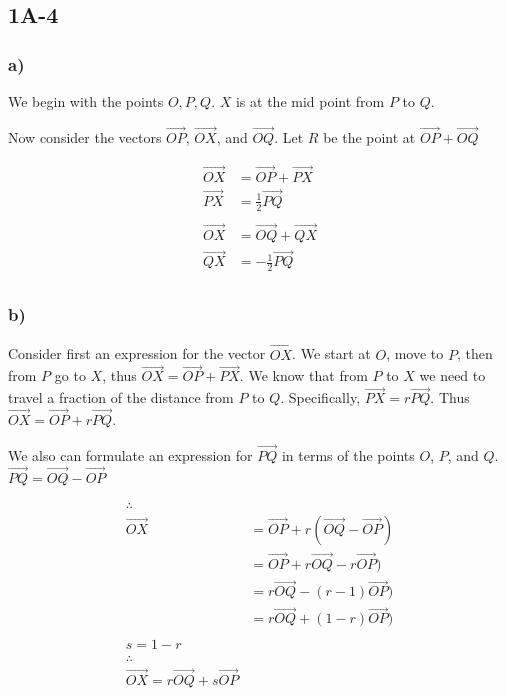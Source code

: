 \documentclass[main.tex]{subfiles}
\begin{document}
\subsection*{1A-4}

\subsubsection*{a)}

We begin with the points $O, P, Q$. $X$ is at the mid point from $P$
to $Q$.

Now consider the vectors $\vec{OP}$, $\vec{OX}$, and $\vec{OQ}$.
Let $R$ be the point at $\vec{OP} + \vec{OQ}$

\begin{align*}
\vec{OX} &= \vec{OP} + \vec{PX} \\
\vec{PX} &= \frac{1}{2}\vec{PQ} \\
\\
\vec{OX} &= \vec{OQ} + \vec{QX}\\
\vec{QX} &= -\frac{1}{2}\vec{PQ} \\
\end{align*}


\subsubsection*{b)}

    Consider first an expression for the vector $\vec{OX}$.
    We start at $O$, move to $P$, then from $P$ go to $X$,
    thus $\vec{OX} = \vec{OP} + \vec{PX}$.
    We know that from $P$ to $X$ we need to travel a fraction of the
    distance from $P$ to $Q$. Specifically, $\vec{PX} = r\vec{PQ}$.
    Thus $\vec{OX} = \vec{OP} + r\vec{PQ}$.

    We also can formulate an expression for $\vec{PQ}$ in terms
    of the points $O$, $P$, and $Q$. $\vec{PQ} = \vec{OQ} - \vec{OP}$


    \begin{align*}
    \therefore\\
        \vec{OX} &= \vec{OP} + r(\vec{OQ} - \vec{OP})\\
        &= \vec{OP} + r\vec{OQ} - r\vec{OP})\\
        &= r\vec{OQ} - (r-1)\vec{OP})\\
        &= r\vec{OQ} + (1-r)\vec{OP})\\
        \\
        s = 1 - r\\
        \therefore\\
        \vec{OX} = r\vec{OQ} + s\vec{OP}
    \end{align*}
\end{document}
